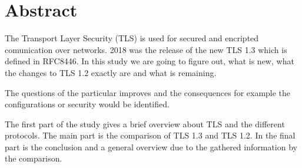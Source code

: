\chapter*{Abstract}
\label{chap:abstract}
The Transport Layer Security (TLS) is used for secured and encripted comunication over networks. 2018 was the release of the new TLS 1.3 which is defined in RFC8446. In this study we are going to figure out, what is new, what the changes to TLS 1.2 exactly are and what is remaining. 

The questions of the particular improves and the consequences for example the configurations or security would be identified. 

The first part of the study gives a brief overview about TLS and the different protocols. The main part is the comparison of TLS 1.3 and TLS 1.2. In the final part is the conclusion and a general overview due to the gathered information by the comparison.


